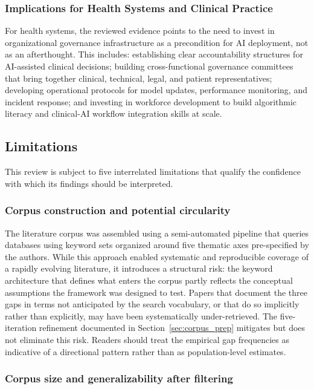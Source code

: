 \subsubsection{Implications for Health Systems and Clinical Practice}

For health systems, the reviewed evidence points to the need to invest
in organizational governance infrastructure as a precondition for AI
deployment, not as an afterthought. This includes: establishing clear
accountability structures for AI-assisted clinical decisions; building
cross-functional governance committees that bring together clinical,
technical, legal, and patient representatives; developing operational
protocols for model updates, performance monitoring, and incident
response; and investing in workforce development to build algorithmic
literacy and clinical-AI workflow integration skills at scale.

\subsection{Limitations}
\label{sec:discussion_limitations}

This review is subject to five interrelated limitations that qualify the confidence with which its findings should be interpreted.

\subsubsection{Corpus construction and potential circularity}
\label{sec:limitation_circularity}

The literature corpus was assembled using a semi-automated pipeline that queries databases using keyword sets organized around five thematic axes pre-specified by the authors. While this approach enabled systematic and reproducible coverage of a rapidly evolving literature, it introduces a structural risk: the keyword architecture that defines what enters the corpus partly reflects the conceptual assumptions the framework was designed to test. Papers that document the three gaps in terms not anticipated by the search vocabulary, or that do so implicitly rather than explicitly, may have been systematically under-retrieved. The five-iteration refinement documented in Section~\ref{sec:corpus_prep} mitigates but does not eliminate this risk. Readers should treat the empirical gap frequencies as indicative of a directional pattern rather than as population-level estimates.

\subsubsection{Corpus size and generalizability after filtering}
\label{sec:limitation_corpus_size}

